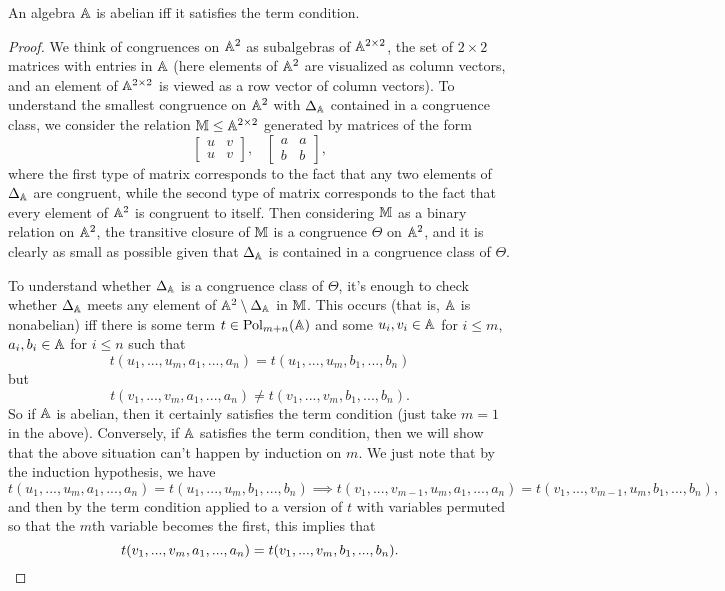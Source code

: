 \documentclass[letterpaper,11pt]{article}
\DeclareMathOperator{\Pol}{Pol}
\begin{document}
\begin{prop} An algebra $\mathbb{A}$ is abelian iff it satisfies the term condition.
\end{prop}
\begin{proof} We think of congruences on $\mathbb{A}^2$ as subalgebras of $\mathbb{A}^{2\times 2}$, the set of $2\times 2$ matrices with entries in $\mathbb{A}$ (here elements of $\mathbb{A}^2$ are visualized as column vectors, and an element of $\mathbb{A}^{2\times 2}$ is viewed as a row vector of column vectors). To understand the smallest congruence on $\mathbb{A}^2$ with $\Delta_{\mathbb{A}}$ contained in a congruence class, we consider the relation $\mathbb{M} \le \mathbb{A}^{2\times 2}$ generated by matrices of the form
\[
\begin{bmatrix} u & v\\ u & v\end{bmatrix}, \;\;\; \begin{bmatrix} a & a\\ b & b\end{bmatrix},
\]
where the first type of matrix corresponds to the fact that any two elements of $\Delta_{\mathbb{A}}$ are congruent, while the second type of matrix corresponds to the fact that every element of $\mathbb{A}^2$ is congruent to itself. Then considering $\mathbb{M}$ as a binary relation on $\mathbb{A}^2$, the transitive closure of $\mathbb{M}$ is a congruence $\Theta$ on $\mathbb{A}^2$, and it is clearly as small as possible given that $\Delta_{\mathbb{A}}$ is contained in a congruence class of $\Theta$.

To understand whether $\Delta_{\mathbb{A}}$ is a congruence class of $\Theta$, it's enough to check whether $\Delta_{\mathbb{A}}$ meets any element of $\mathbb{A}^2 \setminus \Delta_{\mathbb{A}}$ in $\mathbb{M}$. This occurs (that is, $\mathbb{A}$ is nonabelian) iff there is some term $t \in \Pol_{m+n}(\bA)$ and some $u_i,v_i \in \mathbb{A}$ for $i \le m$, $a_i,b_i \in \mathbb{A}$ for $i \le n$ such that
\[
t(u_1, ..., u_m, a_1, ..., a_n) = t(u_1, ..., u_m, b_1, ..., b_n)
\]
but
\[
t(v_1, ..., v_m, a_1, ..., a_n) \ne t(v_1, ..., v_m, b_1, ..., b_n).
\]
So if $\mathbb{A}$ is abelian, then it certainly satisfies the term condition (just take $m=1$ in the above). Conversely, if $\mathbb{A}$ satisfies the term condition, then we will show that the above situation can't happen by induction on $m$. We just note that by the induction hypothesis, we have
\[
t(u_1, ..., u_m, a_1, ..., a_n) = t(u_1, ..., u_m, b_1, ..., b_n) \implies t(v_1, ..., v_{m-1}, u_m, a_1, ..., a_n) = t(v_1, ..., v_{m-1}, u_m, b_1, ..., b_n),
\]
and then by the term condition applied to a version of $t$ with variables permuted so that the $m$th variable becomes the first, this implies that
\[
t(v_1, ..., v_m, a_1, ..., a_n) = t(v_1, ..., v_m, b_1, ..., b_n).\qedhere
\]
\end{proof}
\end{document}
